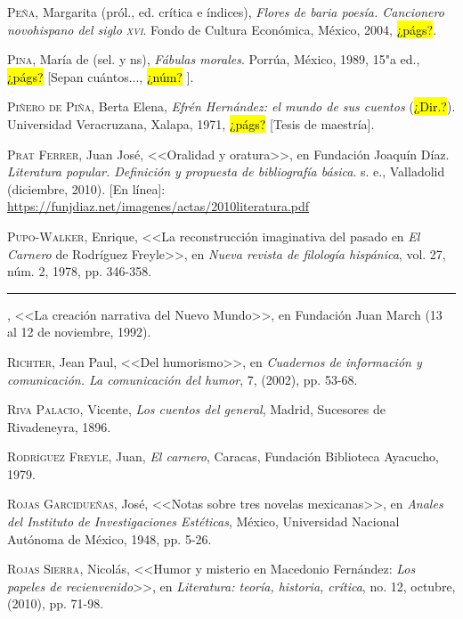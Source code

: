 \documentclass[14pt,twoside,final]{extbook} %
\begin{document}
\textsc{Peña}, Margarita (pról., ed. crítica e índices), \emph{Flores de baria poesía. Cancionero novohispano del siglo \textsc{xvi}}. Fondo de Cultura Económica, México, 2004, \hl{¿págs?}.\label{bib:peña2004}

\textsc{Pina}, María de (sel. y ns), \emph{Fábulas morales}. Porrúa, México, 1989, 15"a ed., \hl{¿págs?} [Sepan cuántos..., \hl{¿núm?} ].\label{bib:pina1989}

\textsc{Piñero de Piña}, Berta Elena, \emph{Efrén Hernández: el mundo de sus cuentos} (\hl{¿Dir.?}). Universidad Veracruzana, Xalapa, 1971, \hl{¿págs?} [Tesis de maestría].\label{bib:piñero1971}

\textsc{Prat Ferrer}, Juan José, <<Oralidad y oratura>>, en Fundación Joaquín Díaz. \emph{Literatura popular. Definición y propuesta de bibliografía básica}. s. e., Valladolid (diciembre, 2010). [En línea]: \url{https://funjdiaz.net/imagenes/actas/2010literatura.pdf}

\textsc{Pupo-Walker}, Enrique, <<La reconstrucción imaginativa del pasado en \emph{El Carnero} de Rodríguez Freyle>>, en \emph{Nueva revista de filología hispánica}, vol. 27, núm. 2, 1978, pp. 346-358.\label{bib:pupowalker1978}

\rule{1cm}{0.4pt}, <<La creación narrativa del Nuevo Mundo>>, en Fundación Juan March (13 al 12 de noviembre, 1992).\label{bib:pupowalker1992}

\textsc{Richter}, Jean Paul, <<Del humorismo>>, en \emph{Cuadernos de información y comunicación. La comunicación del humor}, 7, (2002), pp. 53-68.\label{bib:richter2002}

\textsc{Riva Palacio}, Vicente, \emph{Los cuentos del general}, Madrid, Sucesores de Rivadeneyra, 1896.\label{bib:rivapalacio1896}

\textsc{Rodríguez Freyle}, Juan, \emph{El carnero}, Caracas, Fundación Biblioteca Ayacucho, 1979.\label{bib:rodriguez1979}

\textsc{Rojas Garcidueñas}, José, <<Notas sobre tres novelas mexicanas>>, en \emph{Ana\-les del Instituto de Investigaciones Estéticas}, México, Universidad Nacional Autónoma de México, 1948, pp. 5-26.\label{bib:rojas1948}

\textsc{Rojas Sierra}, Nicolás, <<Humor y misterio en Macedonio Fernández: \emph{Los papeles de recienvenido}>>, en \emph{Literatura: teoría, historia, crítica}, no. 12, octubre, (2010), pp. 71-98.\label{bib:rojas2010}
\end{document}
